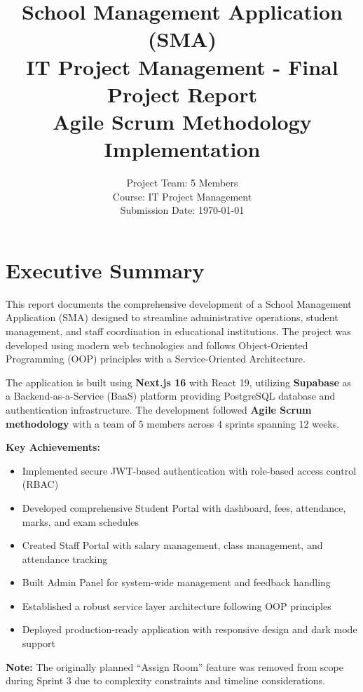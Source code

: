 \documentclass[12pt,a4paper]{article}
\title{\textbf{School Management Application (SMA)}\\
       \large IT Project Management - Final Project Report\\[1em]
       \normalsize Agile Scrum Methodology Implementation}
\author{Project Team: 5 Members\\
        Course: IT Project Management\\
        Submission Date: \today}
\date{}
\begin{document}
\maketitle
\thispagestyle{empty}
\newpage

\tableofcontents
\newpage

\section{Executive Summary}

This report documents the comprehensive development of a School Management Application (SMA) designed to streamline administrative operations, student management, and staff coordination in educational institutions. The project was developed using modern web technologies and follows Object-Oriented Programming (OOP) principles with a Service-Oriented Architecture.

The application is built using \textbf{Next.js 16} with React 19, utilizing \textbf{Supabase} as a Backend-as-a-Service (BaaS) platform providing PostgreSQL database and authentication infrastructure. The development followed \textbf{Agile Scrum methodology} with a team of 5 members across 4 sprints spanning 12 weeks.

\textbf{Key Achievements:}
\begin{itemize}[noitemsep]
    \item Implemented secure JWT-based authentication with role-based access control (RBAC)
    \item Developed comprehensive Student Portal with dashboard, fees, attendance, marks, and exam schedules
    \item Created Staff Portal with salary management, class management, and attendance tracking
    \item Built Admin Panel for system-wide management and feedback handling
    \item Established a robust service layer architecture following OOP principles
    \item Deployed production-ready application with responsive design and dark mode support
\end{itemize}

\textbf{Note:} The originally planned ``Assign Room'' feature was removed from scope during Sprint 3 due to complexity constraints and timeline considerations.
\end{document}

